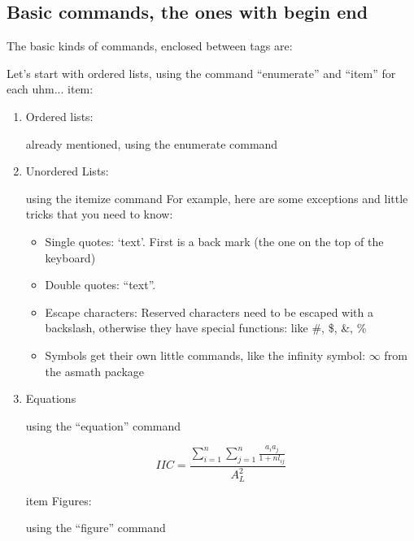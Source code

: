 \documentclass{article}
\begin{document}
\subsection{Basic commands, the ones with begin end}

The basic kinds of commands, enclosed between tags are:

Let's start with ordered lists, using the command ``enumerate'' and ``item'' for each uhm... item:

\begin{enumerate} %
    \item Ordered lists: 
    
    already mentioned, using the enumerate command
    
    \item  Unordered Lists: 
    
    using the itemize command
      For example, here are some exceptions and little tricks that you need to know:
    \begin{itemize}
        \item Single quotes: `text'. First is a back mark (the one on the top of the keyboard)
        \item Double quotes: ``text''.
        \item Escape characters: Reserved characters need to be escaped with a backslash, otherwise they have special functions: like \#, \$, \&, \%
        \item Symbols get their own little commands, like the infinity symbol:  $\infty$  from the asmath package
    \end{itemize}
    
    
    
    \item Equations
    
    using the ``equation'' command
    
    \begin{equation} \label{eq_IIC}
        IIC=\frac{\sum_{i=1}^{n} \sum_{j=1}^{n}\frac{a_{i}a_{j}}{1+nl_{ij}}}{A_{L}^{2}}
    \end{equation}
    
    
    item Figures: 
    
    using the ``figure'' command
    

\end{enumerate}
\end{document}
